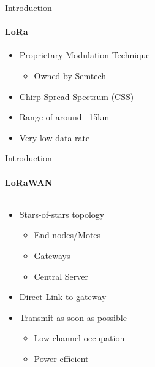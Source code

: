\begin{frame}{Introduction}
\framesubtitle{LoRa}
\begin{itemize}
  \item Proprietary Modulation Technique
  \begin{itemize}
    \item Owned by Semtech
  \end{itemize}
  \item Chirp Spread Spectrum (CSS)
  \item Range of around ~15km
  \item Very low data-rate
\end{itemize}
\end{frame}

\begin{frame}{Introduction}
\framesubtitle{LoRaWAN}
\begin{columns}
\begin{column}{0.5\textwidth}
\begin{itemize}
    \item Stars-of-stars topology
    \begin{itemize}
      \item End-nodes/Motes
      \item Gateways
      \item Central Server
    \end{itemize}
    \item Direct Link to gateway
    \item Transmit as soon as possible
    \begin{itemize}
      \item Low channel occupation
      \item Power efficient
    \end{itemize}
\end{itemize}
\end{column}
\begin{column}{0.5\textwidth}
\begin{figure}[H]
    \centering
\end{figure}
\end{column}
\end{columns}
\end{frame}
